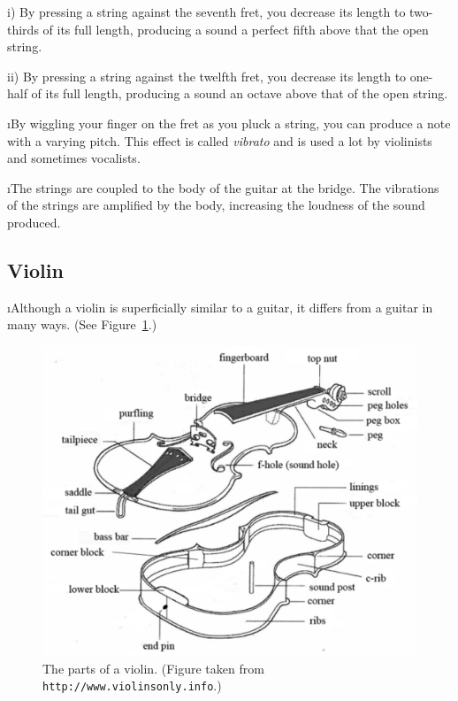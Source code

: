 i) By pressing a string against the seventh fret,
you decrease its length to two-thirds of its full 
length, producing a sound a perfect fifth above
that the open string.

ii) By pressing a string against the twelfth fret,
you decrease its length to one-half of its full
length, producing a sound an octave above that of
the open string.

\i By wiggling your finger on the fret as you
pluck a string, you can produce a note with a 
varying pitch.
This effect is called {\em vibrato} and is used 
a lot by violinists and sometimes vocalists.

\i The strings are coupled to the body of the 
guitar at the bridge.
The vibrations of the strings are amplified by
the body, increasing the loudness of the sound 
produced.

\ei
\subsection{Violin}
\bi

\i Although a violin is superficially similar to a guitar, 
it differs from a guitar in many ways.
(See Figure~\ref{f:violin}.)
%
\begin{figure}[htbp]
\begin{center}
\includegraphics[width=.9\textwidth]{violin.pdf}
\caption{The parts of a violin.
(Figure taken from {\tt http://www.violinsonly.info}.)}
\label{f:violin}
\end{center}
\end{figure}

